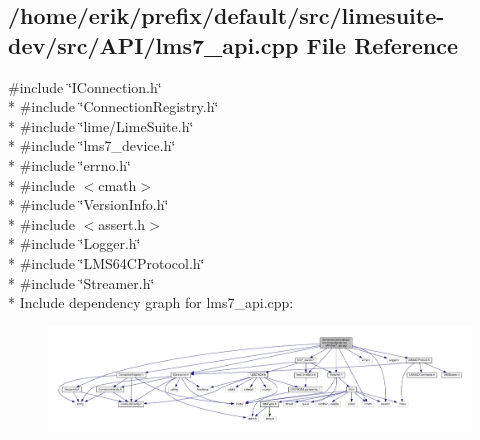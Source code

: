 \subsection{/home/erik/prefix/default/src/limesuite-\/dev/src/\+A\+P\+I/lms7\+\_\+api.cpp File Reference}
\label{lms7__api_8cpp}
{\ttfamily \#include \char`\"{}I\+Connection.\+h\char`\"{}}\\*
{\ttfamily \#include \char`\"{}Connection\+Registry.\+h\char`\"{}}\\*
{\ttfamily \#include \char`\"{}lime/\+Lime\+Suite.\+h\char`\"{}}\\*
{\ttfamily \#include \char`\"{}lms7\+\_\+device.\+h\char`\"{}}\\*
{\ttfamily \#include \char`\"{}errno.\+h\char`\"{}}\\*
{\ttfamily \#include $<$cmath$>$}\\*
{\ttfamily \#include \char`\"{}Version\+Info.\+h\char`\"{}}\\*
{\ttfamily \#include $<$assert.\+h$>$}\\*
{\ttfamily \#include \char`\"{}Logger.\+h\char`\"{}}\\*
{\ttfamily \#include \char`\"{}L\+M\+S64\+C\+Protocol.\+h\char`\"{}}\\*
{\ttfamily \#include \char`\"{}Streamer.\+h\char`\"{}}\\*
Include dependency graph for lms7\+\_\+api.\+cpp\+:
\nopagebreak
\begin{figure}[H]
\begin{center}
\leavevmode
\includegraphics[width=350pt]{de/d2b/lms7__api_8cpp__incl}
\end{center}
\end{figure}
